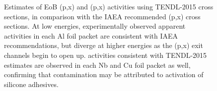 \begin{figure}
    \centering
    \caption{Estimates of EoB (p,x) and (p,x) activities using TENDL-2015 cross sections, in comparison with the IAEA recommended (p,x) cross sections. At low energies, experimentally observed apparent  activities in each Al foil packet are consistent with IAEA recommendations, but diverge at higher energies as the (p,x) exit channels begin to open up.  activities consistent with TENDL-2015 estimates are observed in each Nb and Cu foil packet as well, confirming that contamination may be attributed to activation of silicone adhesives.}
     \label{fig:Na_activity_compare}
\end{figure}



